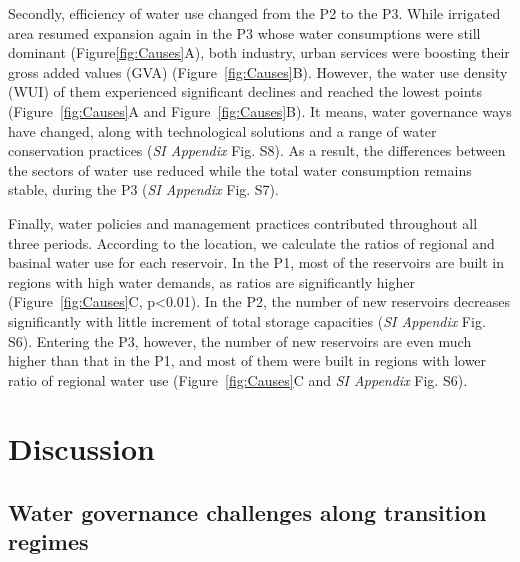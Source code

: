 \documentclass[9pt, twocolumn, twoside, lineno]{pnas-new}
\begin{document}
Secondly, efficiency of water use changed from the P2 to the P3.
While irrigated area resumed expansion again in the P3 whose water consumptions were still dominant (Figure\ref{fig:Causes}A), both industry, urban services were boosting their gross added values (GVA) (Figure~\ref{fig:Causes}B). 
However, the water use density (WUI) of them experienced significant declines and reached the lowest points (Figure~\ref{fig:Causes}A and Figure~\ref{fig:Causes}B).
It means, water governance ways  have changed, along with technological solutions and a range of water conservation practices (\textit{SI Appendix} Fig. S8). As a result, the differences between the sectors of water use reduced while the total water consumption remains stable, during the P3 (\textit{SI Appendix} Fig. S7).

Finally, water policies and management practices contributed throughout all three periods. 
According to the location, we calculate the ratios of regional and basinal water use for each reservoir.
In the P1, most of the reservoirs are built in regions with high water demands, as ratios are significantly higher (Figure~\ref{fig:Causes}C, p<0.01). 
In the P2, the number of new reservoirs decreases significantly with little increment of total storage capacities (\textit{SI Appendix} Fig. S6). 
Entering the P3, however, the number of new reservoirs are even much higher than that in the P1, and most of them were built in regions with lower ratio of regional water use (Figure~\ref{fig:Causes}C and \textit{SI Appendix} Fig. S6).

\section*{Discussion}
\label{Discussion}

\subsection*{Water governance challenges along transition regimes}
\end{document}
